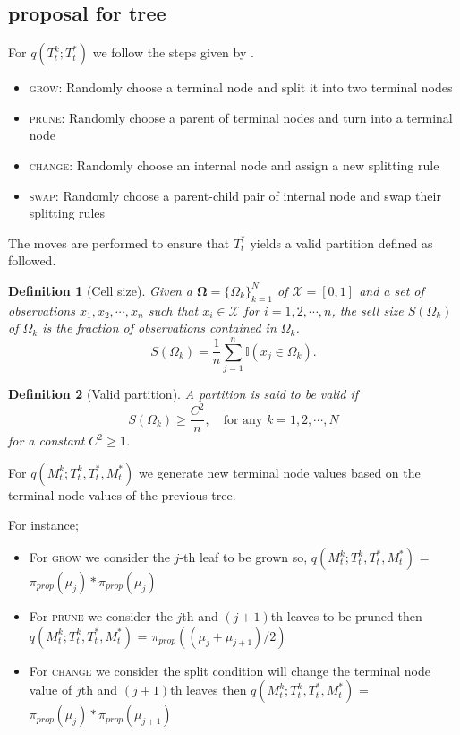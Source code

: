 \documentclass{amsart}
\newtheorem{definition}{Definition}[section]
\begin{document}
\subsection{proposal for tree}
For $q\left(T_t^k;T_t^\ast\right)$ we follow the steps given by \citet{serafini2024lossbasedpriortreetopologies}. 

\begin{itemize}
	\item \textsc{grow}: Randomly choose a terminal node and split it into two terminal nodes
	\item \textsc{prune}: Randomly choose a parent of terminal nodes and turn into a terminal node
	\item \textsc{change}: Randomly choose an internal node and assign a new splitting rule
    \item \textsc{swap}: Randomly choose a parent-child pair of internal node and swap their splitting rules
\end{itemize}

The moves are performed to ensure that $T_t^\ast$ yields a valid partition defined as followed.

\begin{definition}[Cell size] Given a $\mathbf{\Omega} = \{\Omega_k\}_{k=1}^N$ of $\mathcal{X} = [0,1]$ and a set of observations $x_1, x_2, \cdots, x_n$ such that $x_i\in \mathcal{X}$ for $i=1,2,\cdots, n$, the sell size $S(\Omega_k)$ of $\Omega_k$
is the fraction of observations contained in $\Omega_k$.
\begin{equation*}
    S(\Omega_k) = \frac{1}{n}\sum_{j=1}^n \mathbb{I}(x_j\in \Omega_k).
\end{equation*}
\end{definition}

\begin{definition}[Valid partition]
    A partition is said to be valid if
    \begin{equation*}
        S(\Omega_k) \ge \frac{C^2}{n}, \quad\text{for any } k=1,2,\cdots, N
    \end{equation*}
    for a constant $C^2\ge 1$.
\end{definition}

For $q\left(M_t^k;T_t^k, T_t^\ast, M_t^\ast\right)$ we generate new terminal node values based on the terminal node values of the previous tree.

For instance;

\begin{itemize}
	\item For \textsc{grow} we consider the $j$-th leaf to be grown so,
	$q\left(M_t^k;T_t^k, T_t^\ast, M_t^\ast\right)$ = $\pi_{prop}(\mu_j)*\pi_{prop}(\mu_j)$
	\item For \textsc{prune} we consider the $j$th and $(j+1)$th leaves to be pruned then $q\left(M_t^k;T_t^k, T_t^\ast, M_t^\ast\right)$ = $\pi_{prop}((\mu_j + \mu_{j+1})/2)$
	\item For \textsc{change} we consider the split condition will change the terminal node value of $j$th and $(j+1)$th leaves then $q\left(M_t^k;T_t^k, T_t^\ast, M_t^\ast\right)$ = $\pi_{prop}(\mu_j)*\pi_{prop}(\mu_{j+1})$
\end{itemize}
\end{document}
